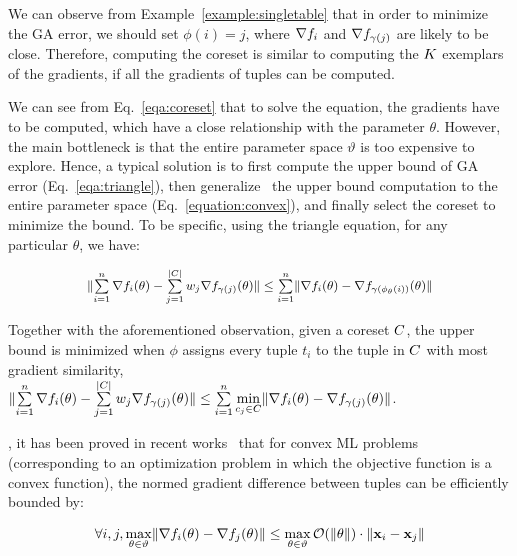  We can observe from Example~\ref{example:singletable} that in order to minimize the GA error, we should set $\phi(i) = j$, where $\nabla f_i$ and $\nabla f_{\gamma(j)}$ are likely to be close. 
Therefore, computing the coreset is similar to computing the $K$ exemplars~\cite{rdusseeun1987clustering} of the gradients, if all the gradients of tuples can be computed.


 We can see from Eq.~\ref{eqa:coreset} that to solve the equation, the gradients have to be computed, which have a close relationship with the parameter  $\theta$. However, the main bottleneck is that  the entire parameter space $\vartheta$ is too expensive to explore. Hence, a typical solution is to  first compute the upper bound of  GA error (Eq.~\ref{eqa:triangle}),  then generalize~\cite{hofmann2015variance, allen2016exploiting,DBLP:conf/icml/MirzasoleimanBL20} the upper bound computation to the entire parameter space (Eq.~\ref{equation:convex}), and finally select the coreset to minimize the bound. To be specific, using the triangle equation, for any particular $\theta$, we have:

\vspace{-0.5em}
\begin{equation}\label{eqa:triangle}\small
\begin{array}{l}
\lVert 
\sum\limits_{i=1}^n\nabla f_i(\theta) - 
\sum\limits_{j=1}^{|C|}w_j\nabla f_{\gamma(j)}(\theta) 
\rVert \leq \sum\limits_{i=1}^n \lVert \nabla f_i(\theta) - \nabla f_{\gamma(\phi_\theta(i))}(\theta) \rVert
\end{array}
\end{equation}

Together with the aforementioned observation, given a coreset $C$, the upper bound is minimized when  $\phi$ assigns
every tuple $t_i$ to the tuple in $C$ with most gradient similarity, \ie $\lVert 
\sum\limits_{i=1}^n\nabla f_i(\theta) - 
\sum\limits_{j=1}^{|C|}w_j\nabla f_{\gamma(j)}(\theta) 
\rVert \leq \sum\limits_{i=1}^n \min \limits_{c_j\in C}\lVert \nabla f_i(\theta) - \nabla f_{\gamma(j)}(\theta) \rVert$.

,  it has been proved in recent works~\cite{hofmann2015variance, allen2016exploiting,DBLP:conf/icml/MirzasoleimanBL20} that for convex ML problems (corresponding to an optimization problem in which the objective function is a convex function), the normed gradient difference between tuples can be efficiently bounded by:

\vspace{-0.5em}
\begin{equation}\label{equation:convex}
\begin{aligned}
\forall  i, j, \max\limits_{\theta\in\vartheta}\lVert \nabla f_i(\theta) - \nabla f_j(\theta) \rVert \le \max\limits_{\theta\in\vartheta}\mathcal{O}(\lVert \theta \rVert) \cdot \lVert \mathbf{x}_i - \mathbf{x}_j \rVert
\end{aligned}
\end{equation}

